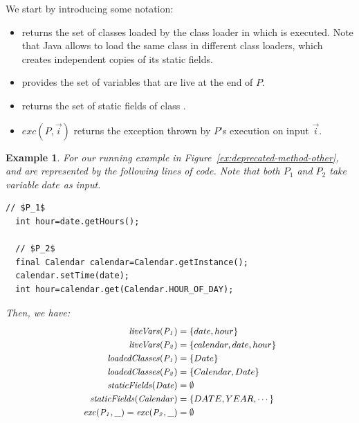 \documentclass[sigconf]{acmart}
\newtheorem{example}{Example}
\begin{document}
We start by introducing some notation:
\begin{itemize}
\item {} returns the set of classes loaded by the class loader
  in which  is executed. Note that Java allows to load the same class
in different class loaders, which creates independent copies of its
static fields.
\item {} provides the set of variables that are live
at the end of $P$. %
\item {} returns
  the set of static fields of class .
\item $exc(P, \vec{i})$ returns the exception thrown by $P$'s execution on input $\vec{i}$.
\end{itemize}

\begin{example}\label{ex:defs}
%
  For our running example in Figure~\ref{ex:deprecated-method-other},
   and  are represented by the following lines of code. Note that
  both $P_1$ and $P_2$ take variable $date$ as input.

\begin{lstlisting}[mathescape=true,showstringspaces=false]
  // $P_1$
  int hour=date.getHours();

  // $P_2$
  final Calendar calendar=Calendar.getInstance();
  calendar.setTime(date);
  int hour=calendar.get(Calendar.HOUR_OF_DAY);
\end{lstlisting}
%
Then, we have:
\[
\small
\begin{aligned}[t]
  \mathit{{liveVars(P_1)}} &= \{date, hour\}\\
  \mathit{{liveVars(P_2)}} &= \{calendar, date, hour\}\\
  \mathit{{loadedClasses(P_1)}} &= \{Date\} \\
  \mathit{{loadedClasses(P_2)}} &= \{Calendar, Date\} \\
  \mathit{{staticFields(Date)}} &= \emptyset\\
  \mathit{{staticFields(Calendar)}} &= \{DATE, YEAR, \cdots\}\\
  \mathit{{exc(P_1, \_)}}=\mathit{{exc(P_2, \_)}} &=\emptyset
\end{aligned}
\]
\end{example}

\end{document}

